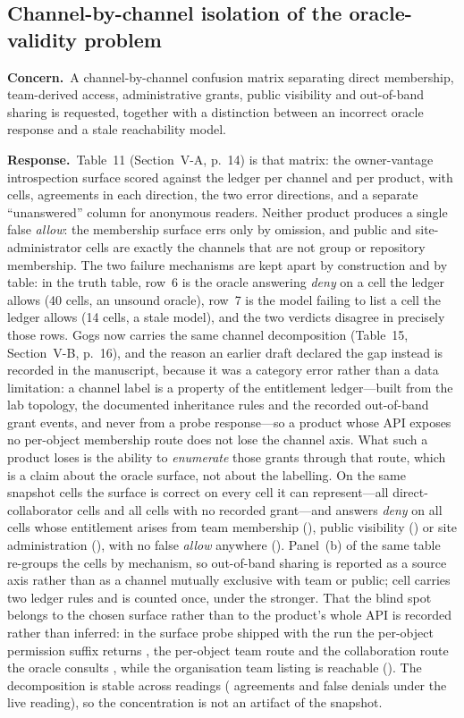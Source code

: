 \documentclass[10pt,letterpaper]{article}
\newcommand{\Concern}[1]{\par\smallskip\noindent\textbf{Concern.}\ #1\par}
\newcommand{\Response}[1]{\par\smallskip\noindent\textbf{Response.}\ #1\par}
\begin{document}
\subsection{Channel-by-channel isolation of the oracle-validity problem}
\Concern{A channel-by-channel confusion matrix separating direct membership,
team-derived access, administrative grants, public visibility and out-of-band
sharing is requested, together with a distinction between an incorrect oracle
response and a stale reachability model.}
\Response{Table~11 (Section~V-A, p.~14) is that matrix: the owner-vantage
introspection surface scored against the ledger per channel and per product, with
cells, agreements in each direction, the two error directions, and a separate
``unanswered'' column for anonymous readers. Neither product produces a single
false \emph{allow}: the membership surface errs only by omission, and public and
site-administrator cells are exactly the channels that are not group or
repository membership. The two failure mechanisms are kept apart by construction
and by table: in the truth table, row~6 is the oracle answering \emph{deny} on a
cell the ledger allows (40 cells, an unsound oracle), row~7 is the model failing
to list a cell the ledger allows (14 cells, a stale model), and the two verdicts
disagree in precisely those rows. Gogs now carries the same channel
decomposition (Table~15, Section~V-B, p.~16), and the reason an earlier draft
declared the gap instead is recorded in the manuscript, because it was a
category error rather than a data limitation: a channel label is a property of
the entitlement ledger---built from the lab topology, the documented inheritance
rules and the recorded out-of-band grant events, and never from a probe
response---so a product whose API exposes no per-object membership route does
not lose the channel axis. What such a product loses is the ability to
\emph{enumerate} those grants through that route, which is a claim about the
oracle surface, not about the labelling. On the same \GgChCells{} snapshot cells
the surface is correct on every cell it can represent---all \GgChCollaboratorAgree{}
direct-collaborator cells and all \GgChNone{} cells with no recorded grant---and
answers \emph{deny} on all \GgChFalseDeny{} cells whose entitlement arises from
team membership (\GgChTeamFalseDeny{}), public visibility (\GgChPublicFalseDeny{})
or site administration (\GgChSiteAdminFalseDeny{}), with no false \emph{allow}
anywhere (\GgChFalseAllow{}). Panel~(b) of the same table re-groups the cells by
mechanism, so out-of-band sharing is reported as a source axis rather than as a
channel mutually exclusive with team or public; \GgChMultiBasis{} cell carries two
ledger rules and is counted once, under the stronger. That the blind spot belongs
to the chosen surface rather than to the product's whole API is recorded rather
than inferred: in the surface probe shipped with the run the per-object
permission suffix returns \GgChProbePermSuffix{}, the per-object team route
\GgChProbeTeamMember{} and the collaboration route the oracle consults
\GgChProbeCollabGet{}, while the organisation team listing is reachable
(\GgChProbeOrgTeams{}). The decomposition is stable across readings
(\GgChLiveAgree{} agreements and \GgChLiveFalseDeny{} false denials under the live
reading), so the concentration is not an artifact of the snapshot.}
\end{document}
